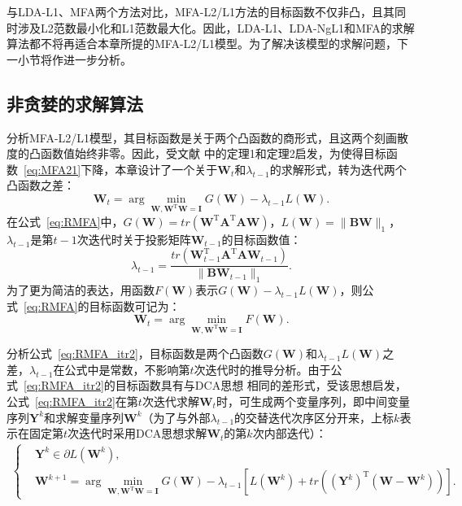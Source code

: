 与LDA-L1、MFA两个方法对比，MFA-L2/L1方法的目标函数不仅非凸，且其同时涉及L2范数最小化和L1范数最大化。因此，LDA-L1、LDA-NgL1和MFA的求解算法都不将再适合本章所提的MFA-L2/L1模型。为了解决该模型的求解问题，下一小节将作进一步分析。

\subsection{非贪婪的求解算法}
分析MFA-L2/L1模型，其目标函数是关于两个凸函数的商形式，且这两个刻画散度的凸函数值始终非零。因此，受文献 \citep{wang2014globally,Wang2014a}中的定理1和定理2启发，为使得目标函数~\eqref{eq:MFA21}下降，本章设计了一个关于$\boldsymbol{W}_t$和$\lambda_{t-1}$的求解形式，转为迭代两个凸函数之差：
\begin{equation}\label{eq:RMFA}
\boldsymbol{W}_t=\arg \min_{\boldsymbol{W},\boldsymbol{W}^\mathrm{T}\boldsymbol{W}=\boldsymbol{I}}G(\boldsymbol{W})- \lambda_{t-1}L(\boldsymbol{W}).
\end{equation}
在公式~\eqref{eq:RMFA}中，$G(\boldsymbol{W})= tr(\boldsymbol{W}^\mathrm{T}\boldsymbol{A}^\mathrm{T}\boldsymbol{AW})$，$L(\boldsymbol{W})=\|\boldsymbol{BW}\|_1$，$\lambda_{t-1}$是第$t-1$次迭代时关于投影矩阵$\boldsymbol{W}_{t-1}$的目标函数值：
\begin{equation}\label{eq:RMFA_itr1}
\lambda_{t-1} = \frac{tr(\boldsymbol{W}_{t-1}^\mathrm{T}\boldsymbol{A}^\mathrm{T}\boldsymbol{A}\boldsymbol{W}_{t-1})}{\|\boldsymbol{B}\boldsymbol{W}_{t-1}\|_1}.
\end{equation}
为了更为简洁的表达，用函数$F(\boldsymbol{W})$表示$G(\boldsymbol{W})- \lambda_{t-1}L(\boldsymbol{W})$，则公式~\eqref{eq:RMFA}的目标函数可记为：
\begin{equation}\label{eq:RMFA_itr2}
\boldsymbol{W}_t=\arg \min_{\boldsymbol{W},\boldsymbol{W}^\mathrm{T}\boldsymbol{W}=\boldsymbol{I}}F(\boldsymbol{W}).
\end{equation}

分析公式~\eqref{eq:RMFA_itr2}，目标函数是两个凸函数$G(\boldsymbol{W})$和$\lambda_{t-1}L(\boldsymbol{W})$之差，$\lambda_{t-1}$在公式中是常数，不影响第$t$次迭代时的推导分析。由于公式~\eqref{eq:RMFA_itr2}的目标函数具有与DCA思想 \citep{tao2005dc}相同的差形式，受该思想启发，公式~\eqref{eq:RMFA_itr2}在第$t$次迭代求解$\boldsymbol{W}_t$时，可生成两个变量序列，即中间变量序列${\boldsymbol{Y}^k}$和求解变量序列${\boldsymbol{W}^k}$（为了与外部$\lambda_{t-1}$的交替迭代次序区分开来，上标$k$表示在固定第$t$次迭代时采用DCA思想求解$\boldsymbol{W}_t$的第$k$次内部迭代）：
\begin{equation}\label{eq:RMFA_SEQ}
\begin{split}
\left\{
   \begin{aligned}
   &\boldsymbol{Y}^k\in \partial L(\boldsymbol{W}^k),\\
   &\boldsymbol{W}^{k+1}=\arg \min_{\boldsymbol{W},\boldsymbol{W}^\mathrm{T}\boldsymbol{W}=\boldsymbol{I}} G(\boldsymbol{W})-\lambda_{t-1} \left[  L(\boldsymbol{W}^k)+tr\left( \left( \boldsymbol{Y}^k \right) ^\mathrm{T} \left(\boldsymbol{W}-\boldsymbol{W}^k \right)\right) \right] .
   \end{aligned}
\right.\\
\end{split}
\end{equation}

